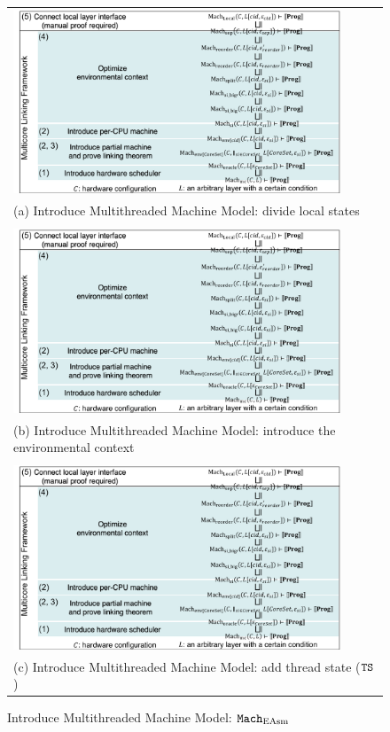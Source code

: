 \begin{figure}
\begin{tabular}{P{0.95\textwidth}}
\includegraphics[width=0.9\textwidth, page=3]{figs/conlink/concurrent_linking}\\
(a) Introduce Multithreaded Machine Model: divide local states\\
\\
\includegraphics[width=0.9\textwidth, page=4]{figs/conlink/concurrent_linking}\\
(b) Introduce Multithreaded Machine Model: introduce the environmental context\\
\\
\includegraphics[width=0.9\textwidth, page=5]{figs/conlink/concurrent_linking}\\
(c) Introduce Multithreaded Machine Model: add thread state (${\mathrm{\texttt{TS}}}$)
\end{tabular}
\caption{Introduce Multithreaded Machine Model: ${\mathrm{\texttt{Mach}}}_{\mathrm{EAsm}}$}
\label{fig:chapter:conlink:multithreaded-machine-model-easm}
\end{figure}


